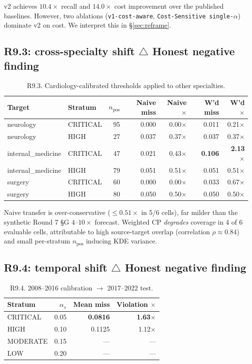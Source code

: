 \documentclass[11pt,letterpaper]{article}
\newcommand{\negfinding}{\textcolor{orange!90!black}{$\bm{\triangle}$ Honest negative finding}}
\begin{document}
v2 achieves $10.4\times$ recall and $14.0\times$ cost improvement over the
published baselines. However, two ablations (\texttt{v1-cost-aware},
\texttt{Cost-Sensitive single-$\alpha$}) dominate v2 on cost. We interpret
this in \S\ref{sec:reframe}.

\subsection{R9.3: cross-specialty shift \negfinding}
\begin{table}[h!]
\centering
\caption{R9.3. Cardiology-calibrated thresholds applied to other
specialties.}
\begin{tabular}{llrrrrr}
\toprule
Target & Stratum & $n_{\text{pos}}$ & Naive miss & Naive $\times$ & W'd miss & W'd $\times$ \\
\midrule
neurology & CRITICAL & 95 & 0.000 & 0.00$\times$ & 0.011 & 0.21$\times$ \\
neurology & HIGH & 27 & 0.037 & 0.37$\times$ & 0.037 & 0.37$\times$ \\
internal\_medicine & CRITICAL & 47 & 0.021 & 0.43$\times$ & \textbf{0.106} & \textbf{2.13$\times$} \\
internal\_medicine & HIGH & 79 & 0.051 & 0.51$\times$ & 0.051 & 0.51$\times$ \\
surgery & CRITICAL & 60 & 0.000 & 0.00$\times$ & 0.033 & 0.67$\times$ \\
surgery & HIGH & 80 & 0.050 & 0.50$\times$ & 0.050 & 0.50$\times$ \\
\bottomrule
\end{tabular}
\end{table}

Naive transfer is over-conservative ($\le 0.51\times$ in 5/6 cells), far
milder than the synthetic Round 7 \S{}G $4$--$10\times$ forecast. Weighted
CP \cite{Tibshirani2019} \emph{degrades} coverage in 4 of 6 evaluable cells,
attributable to high source-target overlap (correlation $\rho \approx 0.84$)
and small per-stratum $n_{\text{pos}}$ inducing KDE variance.

\subsection{R9.4: temporal shift \negfinding}
\begin{table}[h!]
\centering
\caption{R9.4. 2008--2016 calibration $\to$ 2017--2022 test.}
\begin{tabular}{lrrr}
\toprule
Stratum & $\alpha_s$ & Mean miss & Violation $\times$ \\
\midrule
CRITICAL & 0.05 & \textbf{0.0816} & \textbf{1.63$\times$} \\
HIGH & 0.10 & 0.1125 & 1.12$\times$ \\
MODERATE & 0.15 & --- & --- \\
LOW & 0.20 & --- & --- \\
\bottomrule
\end{tabular}
\end{table}
\end{document}
